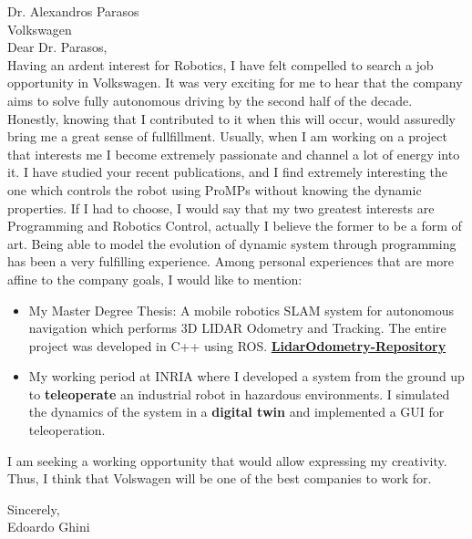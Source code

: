 \begin{FlushLeft}
Dr. Alexandros Parasos \\
Volkswagen\\

\vspace{2cm}
Dear Dr. Parasos,\\

Having an ardent interest for Robotics, I have felt compelled to search a job opportunity in Volkswagen.
It was very exciting for me to hear that the company aims to solve fully autonomous driving by the second half of the decade.
Honestly, knowing that I contributed to it when this will occur, would assuredly bring me a great sense of fullfillment.
Usually, when I am working on a project that interests me I become extremely passionate and channel a lot of energy into it.
I have studied your recent publications, and I find  extremely interesting the one which controls the robot using ProMPs without knowing the dynamic properties.
If I had to choose, I would say that my two greatest interests are Programming and Robotics Control, actually I believe the former to be a form of art.
Being able to model the evolution of dynamic system through programming has been a very fulfilling experience.
Among personal experiences that are more affine to the company goals, I would like to mention:
\begin{itemize}
\item My Master Degree Thesis:  A mobile robotics SLAM system for autonomous navigation which performs 3D LIDAR Odometry and Tracking.
The entire project was developed in C++ using ROS.
\href{https://github.com/dinies/3D-Lidar-Odometry-and-Tracking}{\textbf{LidarOdometry-Repository}}
\item My working period at INRIA where I developed a system from the ground up to \textbf{teleoperate} an industrial robot in hazardous environments.
I simulated the dynamics of the system in a \textbf{digital twin} and implemented a GUI for teleoperation.
\end{itemize}
I am seeking a working opportunity that would allow expressing my creativity.
Thus, I think that Volswagen will be one of the best companies to work for.


\bigskip
Sincerely,\\
Edoardo Ghini
\end{FlushLeft}

